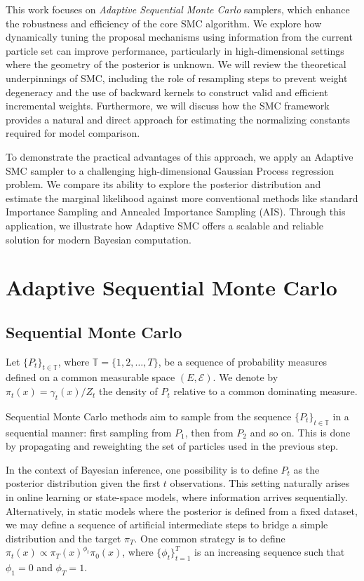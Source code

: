 \documentclass[a4paper, 12pt]{article}
\begin{document}
    This work focuses on \emph{Adaptive Sequential Monte Carlo} samplers, which enhance the robustness and efficiency of the core SMC algorithm. We explore how dynamically tuning the proposal mechanisms using information from the current particle set can improve performance, particularly in high-dimensional settings where the geometry of the posterior is unknown. We will review the theoretical underpinnings of SMC, including the role of resampling steps to prevent weight degeneracy and the use of backward kernels to construct valid and efficient incremental weights. Furthermore, we will discuss how the SMC framework provides a natural and direct approach for estimating the normalizing constants required for model comparison.

    To demonstrate the practical advantages of this approach, we apply an Adaptive SMC sampler to a challenging high-dimensional Gaussian Process regression problem. We compare its ability to explore the posterior distribution and estimate the marginal likelihood against more conventional methods like standard Importance Sampling and Annealed Importance Sampling (AIS). Through this application, we illustrate how Adaptive SMC offers a scalable and reliable solution for modern Bayesian computation.

        

    \section{Adaptive Sequential Monte Carlo}

    \subsection{Sequential Monte Carlo}

    Let $\{P_t\}_{t\in\mathbb{T} }$, where $\mathbb{T} = \{1, 2, \dotsc, T\}$, be a sequence of probability measures defined on a common measurable space $(E, \mathcal{E})$. We denote by $\pi_t(x) = \gamma_t(x)/Z_t$ the density of $P_t$ relative to a common dominating measure.

    Sequential Monte Carlo methods aim to sample from the sequence $\{P_t\}_{t \in \mathbb{T}}$ in a sequential manner: first sampling from $P_1$, then from $P_2$ and so on. This is done by propagating and reweighting the set of particles used in the previous step.
    
    In the context of Bayesian inference, one possibility is to define $P_t$ as the posterior distribution given the first $t$ observations. This setting naturally arises in online learning or state-space models, where information arrives sequentially. Alternatively, in static models where the posterior is defined from a fixed dataset, we may define a sequence of artificial intermediate steps to bridge a simple distribution and the target $\pi_T$. One common strategy is to define $\pi_t(x) \propto \pi_T(x)^{\phi_t} \pi_0(x)$, where $\{\phi_t\}_{t=1}^T$ is an increasing sequence such that $\phi_1 = 0$ and $\phi_T = 1$. 
    
\end{document}
